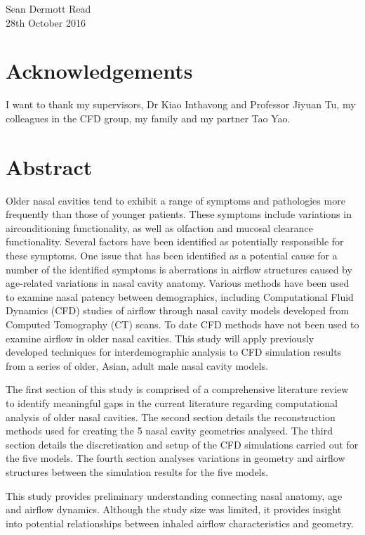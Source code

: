 \documentclass[12pt]{report}
\begin{document}
\vspace{0.3cm}
\noindent
Sean Dermott Read\\

\noindent
28th October 2016
\chapter*{Acknowledgements}
I want to thank my supervisors, Dr Kiao Inthavong and Professor Jiyuan Tu, my colleagues in the CFD group, my family and my partner Tao Yao. 

\tableofcontents

\newpage
\listoffigures
\listoftables

\chapter*{Abstract}
Older nasal cavities tend to exhibit a range of symptoms and pathologies more frequently than those of younger patients. These symptoms include variations in airconditioning functionality, as well as olfaction and mucosal clearance functionality. 
Several factors have been identified as potentially responsible for these symptoms. 
One issue that has been identified as a potential cause for a number of the identified symptoms is aberrations in airflow structures caused by age-related variations in nasal cavity anatomy. 
Various methods have been used to examine nasal patency between demographics, including Computational Fluid Dynamics (CFD) studies of airflow through nasal cavity models developed from Computed Tomography (CT) scans. 
To date CFD methods have not been used to examine airflow in older nasal cavities.
This study will apply previously developed techniques for interdemographic analysis to CFD simulation results from a series of older, Asian, adult male nasal cavity models.


The first section of this study is comprised of a comprehensive literature review to identify meaningful gaps in the current literature regarding computational analysis of older nasal cavities. 
The second section details the reconstruction methods used for creating the 5 nasal cavity geometries analysed.
The third section details the discretisation and setup of the CFD simulations carried out for the five models.
The fourth section analyses variations in geometry and airflow structures between the simulation results for the five models.

This study provides preliminary understanding connecting nasal anatomy, age and airflow dynamics. Although the study size was limited, it provides insight into potential relationships between inhaled airflow characteristics and geometry.
\end{document}

